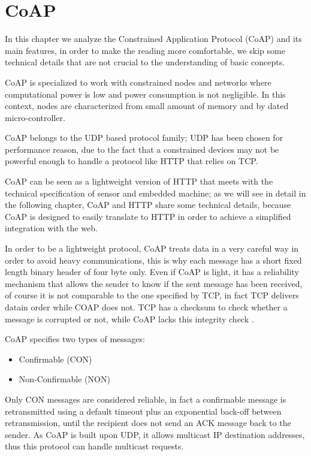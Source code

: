 
	\chapter{CoAP}\label{ch:coap}
	In this chapter we analyze the Constrained Application Protocol (CoAP) and its main features, in order to make the reading more comfortable,
	we skip some technical details that are not crucial to the understanding of basic concepts.\newline
	
	CoAP is specialized to work with constrained nodes and networks where computational power is low and power consumption is not negligible.\newline
	In this context, nodes are characterized from small amount of memory and by dated micro-controller.\newline
	
	CoAP belongs to the UDP based protocol family; UDP has been chosen for performance reason, due to the fact that a constrained devices may not be powerful enough to handle a protocol like HTTP that relies on TCP.\newline
	
	CoAP can be seen as a lightweight version of HTTP that meets with the technical specification of sensor and embedded machine; as we will see in detail in the following chapter, CoAP and HTTP share some technical details, because CoAP is designed to easily translate to HTTP in order to achieve a simplified integration with the web.\newline
	
	In order to be a lightweight protocol, CoAP treats data in a very careful way in order to avoid heavy communications, this is why each message has a short fixed length binary header of four byte only. Even if CoAP is light, it has a reliability mechanism that allows the sender to know if the sent message has been received, of course it is not comparable to the one specified by TCP, in fact TCP delivers datain order while COAP does not.
	TCP has a checksum to check whether a message is corrupted or not, while CoAP lacks this integrity check .\newline
	
	CoAP specifies two types of messages:
	\begin{itemize}
		\item Confirmable (CON)
		\item Non-Confirmable (NON)
	\end{itemize}
	Only CON messages are considered reliable, in fact a confirmable message is retransmitted using a default timeout plus an exponential back-off between retransmission, until the recipient does not send an ACK message back to the sender.\newline
	As CoAP is built upon UDP, it allows multicast IP destination addresses, thus this protocol can handle multicast requests.\newline
	
